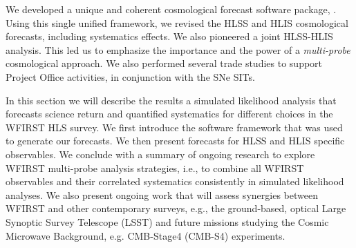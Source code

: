 \newcommand{\nn}{\nonumber}
\newcommand{\vpi}{\mathbf \pi}
\newcommand{\vecd}{\mathbf d}
\newcommand{\matC}{\mathbf C}
\newcommand{\matQ}{\mathbf Q}

\newcommand{\om}{\Omega_\mr m}
\newcommand{\omb}{\Omega_\mr b}
\newcommand{\sig}{\sigma_8}
\newcommand{\ns}{n_s}
\newcommand{\w}{w_0}
\newcommand{\wa}{w_a}

\renewcommand{\d}{{\rm d}}
\newcommand{\pd}{P_{\delta}}
\newcommand{\pe}{P_\mr E}

\newcommand{\vt}{\vartheta}
\newcommand{\vp}{\varphi}
\newcommand{\eps}{\epsilon}
\newcommand{\abs}[1]{| #1 |}
\newcommand{\mr}{\mathrm}

\renewcommand{\d}{{\rm d}}

\newcommand{\like}{L}
\newcommand{\prob}{P}
\newcommand{\probr}{P_r}
\newcommand{\p}{\mathbf p}
\newcommand{\pco}{\mathbf p_\mr{c}}
\newcommand{\pnu}{\mathbf p_\mr{n}}
\newcommand{\plf}{\mathbf p_\mr{LF}}
\newcommand{\D}{\mathbf D}
\newcommand{\Del}{\mathbf \Delta}
\newcommand{\M}{\mathbf M}
\newcommand{\N}{\mathbf N}
\newcommand{\U}{\mathbf U}


\begin{summary}
We developed a unique and coherent cosmological forecast software package, \CoLi. Using this single unified framework, we revised the HLSS and HLIS cosmological forecasts, including systematics effects. We also pioneered a joint HLSS-HLIS analysis. This led us to emphasize the importance and the power of a \emph{multi-probe} cosmological approach. We also performed several trade studies to support Project Office activities, in conjunction with the SNe SITs.
\end{summary}


In this section we will describe the results a simulated likelihood analysis that forecasts science return and quantified systematics for different choices in the WFIRST HLS survey. We first introduce the \CoLi software framework that was used to generate our forecasts. We then present forecasts for HLSS and HLIS specific observables. We conclude with a summary of ongoing research to explore WFIRST multi-probe analysis strategies, i.e., to combine all WFIRST observables and their correlated systematics consistently in simulated likelihood analyses. We also present ongoing work that will assess synergies between WFIRST and other contemporary surveys, e.g., the ground-based, optical Large Synoptic Survey Telescope (LSST) and future missions studying the Cosmic Microwave Background, e.g. CMB-Stage4 (CMB-S4) experiments.

